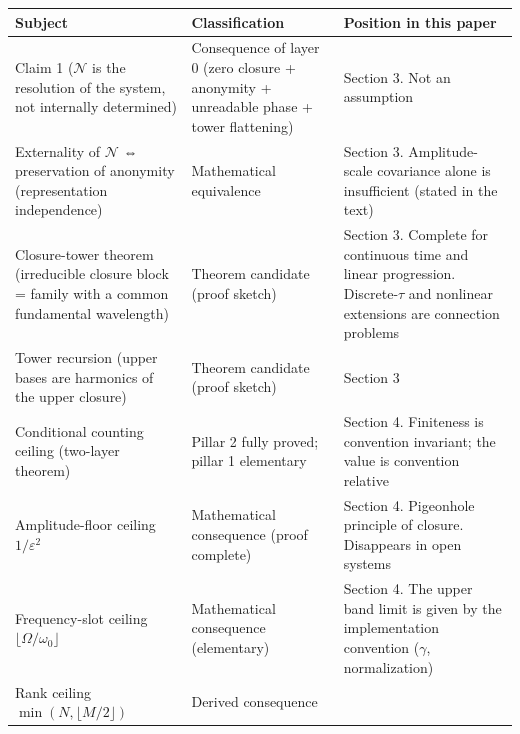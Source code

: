 \documentclass[
  a4paper,
]{article}
\newcounter{none} %
\begin{document}
{\def\LTcaptype{none} %
\begin{longtable}[]{@{}
  >{\raggedright\arraybackslash}p{}
  >{\raggedright\arraybackslash}p{}
  >{\raggedright\arraybackslash}p{}@{}}
\toprule\noalign{}
\begin{minipage}[b]{\linewidth}\raggedright
Subject
\end{minipage} & \begin{minipage}[b]{\linewidth}\raggedright
Classification
\end{minipage} & \begin{minipage}[b]{\linewidth}\raggedright
Position in this paper
\end{minipage} \\
\midrule\noalign{}
\endhead
\bottomrule\noalign{}
\endlastfoot
Claim 1 (\(\mathcal N\) is the resolution of the system, not internally
determined) & Consequence of layer 0 (zero closure + anonymity +
unreadable phase + tower flattening) & Section 3. Not an assumption \\
Externality of \(\mathcal N\) ⇔ preservation of anonymity
(representation independence) & Mathematical equivalence & Section 3.
Amplitude-scale covariance alone is insufficient (stated in the text) \\
Closure-tower theorem (irreducible closure block = family with a common
fundamental wavelength) & Theorem candidate (proof sketch) & Section 3.
Complete for continuous time and linear progression. Discrete-\(\tau\)
and nonlinear extensions are connection problems \\
Tower recursion (upper bases are harmonics of the upper closure) &
Theorem candidate (proof sketch) & Section 3 \\
Conditional counting ceiling (two-layer theorem) & Pillar 2 fully
proved; pillar 1 elementary & Section 4. Finiteness is convention
invariant; the value is convention relative \\
Amplitude-floor ceiling \(1/\varepsilon^2\) & Mathematical consequence
(proof complete) & Section 4. Pigeonhole principle of closure.
Disappears in open systems \\
Frequency-slot ceiling \(\lfloor\Omega/\omega_0\rfloor\) & Mathematical
consequence (elementary) & Section 4. The upper band limit is given by
the implementation convention (\(\gamma\), normalization) \\
Rank ceiling \(\min(N,\lfloor M/2\rfloor)\) & Derived consequence

\end{longtable}}
\end{document}
